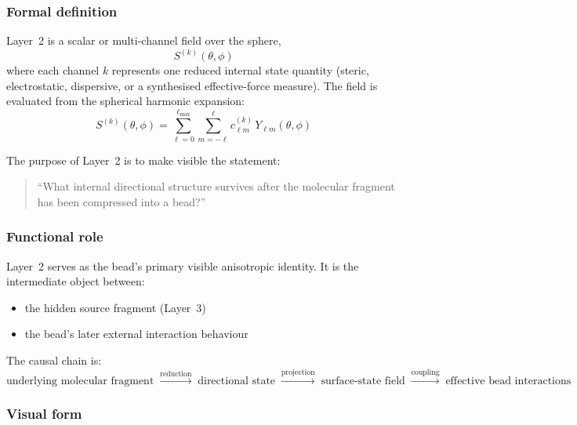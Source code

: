 \documentclass[11pt]{article}
\begin{document}
\subsubsection{Formal definition}

Layer~2 is a scalar or multi-channel field over the sphere,
\begin{equation}
    S^{(k)}(\theta, \phi)
\end{equation}
where each channel $k$ represents one reduced internal state quantity
(steric, electrostatic, dispersive, or a synthesised effective-force
measure).  The field is evaluated from the spherical harmonic expansion:
\begin{equation}
    S^{(k)}(\theta, \phi)
    = \sum_{\ell=0}^{\ell_{\max}}
      \sum_{m=-\ell}^{\ell}
      c_{\ell m}^{(k)}\, Y_{\ell m}(\theta, \phi)
\end{equation}

The purpose of Layer~2 is to make visible the statement:

\begin{quote}
``What internal directional structure survives after the molecular fragment
has been compressed into a bead?''
\end{quote}

\subsubsection{Functional role}

Layer~2 serves as the bead's primary visible anisotropic identity.  It is
the intermediate object between:
\begin{itemize}
    \item the hidden source fragment (Layer~3)
    \item the bead's later external interaction behaviour
\end{itemize}

The causal chain is:
\begin{equation}
    \text{underlying molecular fragment}
    \;\xrightarrow{\text{reduction}}\;
    \text{directional state}
    \;\xrightarrow{\text{projection}}\;
    \text{surface-state field}
    \;\xrightarrow{\text{coupling}}\;
    \text{effective bead interactions}
\end{equation}

\subsubsection{Visual form}
\end{document}
